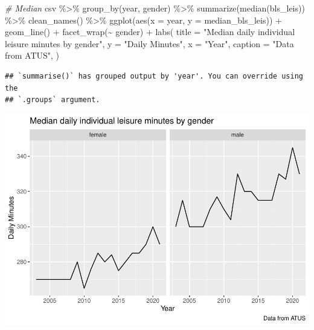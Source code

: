 \documentclass[
]{article}
\newenvironment{Shaded}{\begin{snugshade}}{\end{snugshade}}
\newcommand{\AttributeTok}[1]{\textcolor[rgb]{0.77,0.63,0.00}{#1}}
\newcommand{\CommentTok}[1]{\textcolor[rgb]{0.56,0.35,0.01}{\textit{#1}}}
\newcommand{\FunctionTok}[1]{\textcolor[rgb]{0.00,0.00,0.00}{#1}}
\newcommand{\NormalTok}[1]{#1}
\newcommand{\SpecialCharTok}[1]{\textcolor[rgb]{0.00,0.00,0.00}{#1}}
\newcommand{\StringTok}[1]{\textcolor[rgb]{0.31,0.60,0.02}{#1}}
\begin{document}
\begin{Shaded}
\begin{Highlighting}[]
\CommentTok{\# Median}
\NormalTok{csv }\SpecialCharTok{\%\textgreater{}\%}
  \FunctionTok{group\_by}\NormalTok{(year, gender) }\SpecialCharTok{\%\textgreater{}\%}
  \FunctionTok{summarize}\NormalTok{(}\FunctionTok{median}\NormalTok{(bls\_leis)) }\SpecialCharTok{\%\textgreater{}\%}
  \FunctionTok{clean\_names}\NormalTok{() }\SpecialCharTok{\%\textgreater{}\%}
  \FunctionTok{ggplot}\NormalTok{(}\FunctionTok{aes}\NormalTok{(}\AttributeTok{x =}\NormalTok{ year, }\AttributeTok{y =}\NormalTok{ median\_bls\_leis)) }\SpecialCharTok{+}
  \FunctionTok{geom\_line}\NormalTok{() }\SpecialCharTok{+}
  \FunctionTok{facet\_wrap}\NormalTok{(}\SpecialCharTok{\textasciitilde{}}\NormalTok{ gender) }\SpecialCharTok{+}
  \FunctionTok{labs}\NormalTok{(}
  \AttributeTok{title =} \StringTok{"Median daily individual leisure minutes by gender"}\NormalTok{,}
  \AttributeTok{y =} \StringTok{"Daily Minutes"}\NormalTok{,}
  \AttributeTok{x =} \StringTok{"Year"}\NormalTok{,}
  \AttributeTok{caption =} \StringTok{"Data from ATUS"}\NormalTok{,}
\NormalTok{) }
\end{Highlighting}
\end{Shaded}

\begin{verbatim}
## `summarise()` has grouped output by 'year'. You can override using the
## `.groups` argument.
\end{verbatim}

\includegraphics{Paper2_files/figure-latex/graphs-5.pdf}
\end{document}
